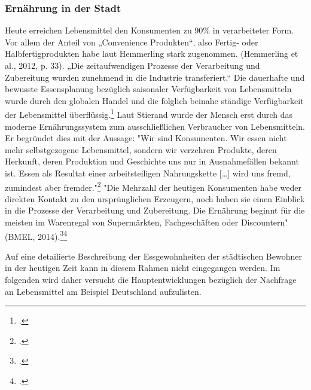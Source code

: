 \documentclass{scrartcl}
\begin{document}
\subsubsection {Ernährung in der Stadt}
Heute erreichen Lebensmittel den Konsumenten zu 90\% in verarbeiteter Form. Vor allem der Anteil von „Convenience Produkten“, also Fertig- oder Halbfertigprodukten habe laut Hemmerling stark zugenommen. (Hemmerling et al., 2012, p. 33). „Die zeitaufwendigen Prozesse der Verarbeitung und Zubereitung wurden zunehmend in die Industrie transferiert.“  
Die dauerhafte und bewusste Essensplanung bezüglich saisonaler Verfügbarkeit von Lebensmitteln wurde durch den globalen Handel und die folglich beinahe ständige Verfügbarkeit der Lebensmittel überflüssig.\footcite[Vgl.][S.20]{SchmidtDieVon}
Laut Stierand wurde der Mensch erst durch das moderne Ernährungssystem zum ausschließlichen Verbraucher von Lebensmitteln. Er begründet dies mit der Aussage: "Wir sind Konsumenten. Wir essen nicht mehr selbstgezogene Lebensmittel, sondern wir verzehren Produkte, deren Herkunft, deren Produktion und Geschichte uns nur in Ausnahmefällen bekannt ist. Essen als Resultat einer arbeitsteiligen Nahrungskette […] wird uns fremd, zumindest aber fremder."\footcite{Spiekermann2000GesundeKulturwissenschaft} 
"Die Mehrzahl der heutigen Konsumenten habe weder direkten Kontakt zu den ursprünglichen Erzeugern, noch haben sie einen Einblick in die Prozesse der Verarbeitung und Zubereitung.
Die Ernährung beginnt für die meisten im Warenregal von Supermärkten, Fachgeschäften oder Discountern" (BMEL, 2014).\footcite[S.20]{SchmidtDieVon}\footcite[Vgl.]{BerichtInhalt}

 Auf eine detailierte Beschreibung der Essgewohnheiten der städtischen Bewohner in der heutigen Zeit kann in diesem Rahmen nicht eingegangen werden. Im folgenden wird daher versucht die Hauptentwicklungen bezüglich der Nachfrage an Lebensmittel am Beispiel Deutschland aufzulisten. 
 
\end{document}
